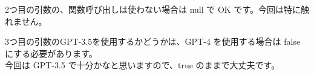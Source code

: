 \begin{Shaded}
\begin{Highlighting}[]
\NormalTok{\{}
  \OperatorTok{:}\NormalTok{ [}
\NormalTok{    \{ }\OperatorTok{:} \OperatorTok{,} \OperatorTok{:} \NormalTok{ \}}\OperatorTok{,}
\NormalTok{    \{ }\OperatorTok{:} \OperatorTok{,} \OperatorTok{:} \NormalTok{ \}}\OperatorTok{,}
\NormalTok{    \{ }\OperatorTok{:} \OperatorTok{,} \OperatorTok{:} \NormalTok{ \}}
\NormalTok{  ]}
\NormalTok{\}}
\end{Highlighting}
\end{Shaded}

2つ目の引数の、関数呼び出しは使わない場合は null で OK
です。今回は特に触れません。

3つ目の引数のGPT-3.5を使用するかどうかは、GPT-4 を使用する場合は false
にする必要があります。\\
今回は GPT-3.5 で十分かなと思いますので、true のままで大丈夫です。
